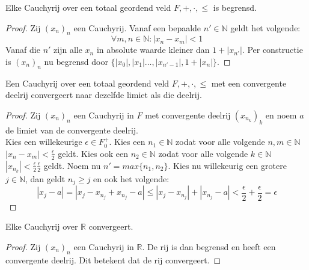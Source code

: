 \documentclass[main.tex]{subfiles}
\begin{document}
\begin{pr}
  \label{pr:cauchyrij-begrensd}
  Elke Cauchyrij over een totaal geordend veld $F,+,\cdot,\le$ is begrensd.

  \begin{proof}
    Zij $(x_{n})_{n}$ een Cauchyrij.
    Vanaf een bepaalde $n'\in \mathbb{N}$ geldt het volgende:
    \[ \forall m,n \in \mathbb{N}: |x_{n}-x_{m}| < 1 \]
    Vanaf die $n'$ zijn alle $x_{n}$ in absolute waarde kleiner dan $1+|x_{n'}|$.
    Per constructie is $(x_{n})_{n}$ nu begrensd door $\{ |x_{0}|, |x_{1}| \dotsc, |x_{n'-1}|, 1+|x_{n}| \}$.
  \end{proof}
\end{pr} 

\begin{pr}
  \label{pr-cauchyrij-met-convergente-deelrij-convergeert}
  Een Cauchyrij over een totaal geordend veld $F,+,\cdot,\le$ met een convergente deelrij convergeert naar dezelfde limiet als die deelrij.

  \begin{proof}
    Zij $(x_{n})_{n}$ een Cauchyrij in $F$ met convergente deelrij $(x_{n_{k}})_{k}$ en noem $a$ de limiet van de convergente deelrij.\\
    Kies een willekeurige $\epsilon \in F_{0}^{+}$.
    Kies een $n_{1} \in \mathbb{N}$ zodat voor alle volgende $n,m\in\mathbb{N}$ $|x_{n}-x_{m}| < \frac{\epsilon}{2}$ geldt.
    Kies ook een $n_{2} \in \mathbb{N}$ zodat voor alle volgende $k\in\mathbb{N}$ $|x_{n_{k}}| < \frac{\epsilon}{2} \frac{\epsilon}{2}$ geldt.
    Noem nu $n' = max\{n_{1},n_{2}\}$.
    Kies nu willekeurig een grotere $j\in \mathbb{N}$, dan geldt $n_{j} \ge j$ en ook het volgende:
    \[ |x_{j} - a| = |x_{j}-x_{n_{j}}+x_{n_{j}}-a| \le |x_{j}-x_{n_{j}}|+|x_{n_{j}}-a| < \frac{\epsilon}{2} + \frac{\epsilon}{2} = \epsilon \]
  \end{proof}
\end{pr}

\begin{pr}
  \label{pr:cauchyrij-in-R-convergeert}
  Elke Cauchyrij over $\mathbb{R}$ convergeert.

  \begin{proof}
    Zij $(x_{n})_{n}$ een Cauchyrij in $\mathbb{R}$.
    De rij is dan begrensd en heeft een convergente deelrij.
    Dit betekent dat de rij convergeert.
  \end{proof}
\end{pr}
\end{document}
